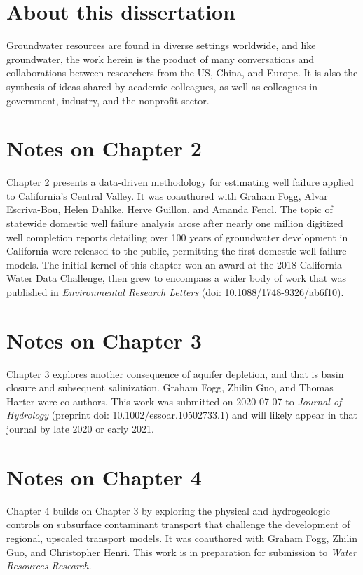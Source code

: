 \section*{About this dissertation}   

Groundwater resources are found in diverse settings worldwide, and like groundwater, the work herein is the product of many conversations and collaborations between researchers from the US, China, and Europe. It is also the synthesis of ideas shared by academic colleagues, as well as colleagues in government, industry, and the nonprofit sector. 


\section*{Notes on Chapter 2}

Chapter 2 presents a data-driven methodology for estimating well failure applied to California's Central Valley. It was coauthored with Graham Fogg, Alvar Escriva-Bou, Helen Dahlke, Herve Guillon, and Amanda Fencl. The topic of statewide domestic well failure analysis arose after nearly one million digitized well completion reports detailing over 100 years of groundwater development in California were released to the public, permitting the first domestic well failure models. The initial kernel of this chapter won an award at the 2018 California Water Data Challenge, then grew to encompass a wider body of work that was published in \textit{Environmental Research Letters} (doi: 10.1088/1748-9326/ab6f10).

   
\section*{Notes on Chapter 3} 

Chapter 3 explores another consequence of aquifer depletion, and that is basin closure and subsequent salinization. Graham Fogg, Zhilin Guo, and Thomas Harter were co-authors. This work was submitted on 2020-07-07 to \textit{Journal of Hydrology} (preprint doi: 10.1002/essoar.10502733.1) and will likely appear in that journal by late 2020 or early 2021. 
    
    
\section*{Notes on Chapter 4} 

Chapter 4 builds on Chapter 3 by exploring the physical and hydrogeologic controls on subsurface contaminant transport that challenge the development of regional, upscaled transport models. It was coauthored with Graham Fogg, Zhilin Guo, and Christopher Henri. This work is in preparation for submission to \textit{Water Resources Research}. 

